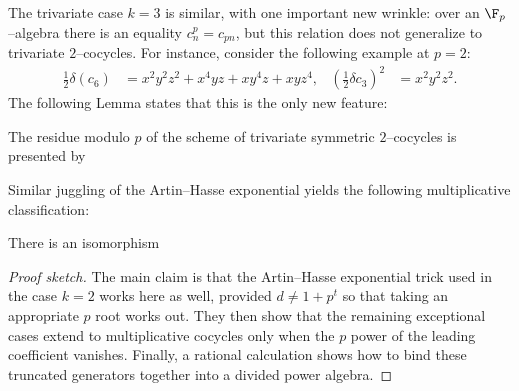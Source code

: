 The trivariate case \(k = 3\) is similar, with one important new wrinkle: over an \(\F_p\)--algebra there is an equality \(c_n^p = c_{pn}\), but this relation does not generalize to trivariate \(2\)--cocycles.
For instance, consider the following example at \(p = 2\):
\begin{align*}
\frac{1}{2} \delta (c_6) & = x^2 y^2 z^2 + x^4 y z + x y^4 z + x y z^4, &
\left(\frac{1}{2} \delta c_3\right)^2 & = x^2 y^2 z^2.
\end{align*}
The following Lemma states that this is the only new feature:
\begin{lemma}
\pushQED{\qed}
The residue modulo \(p\) of the scheme of trivariate symmetric \(2\)--cocycles is presented by
\begin{center}
\end{center}
\end{lemma}

\noindent Similar juggling of the Artin--Hasse exponential yields the following multiplicative classification:
\begin{theorem}\label{AHSCalculationOfC3}
There is an isomorphism
\begin{center}
\end{center}
\end{theorem}
\begin{proof}[Proof sketch]
The main claim is that the Artin--Hasse exponential trick used in the case \(k = 2\) works here as well, provided \(d \ne 1 + p^t\) so that taking an appropriate \(p\){\th} root works out.
They then show that the remaining exceptional cases extend to multiplicative cocycles only when the \(p\){\th} power of the leading coefficient vanishes.
Finally, a rational calculation shows how to bind these truncated generators together into a divided power algebra.
\end{proof}

